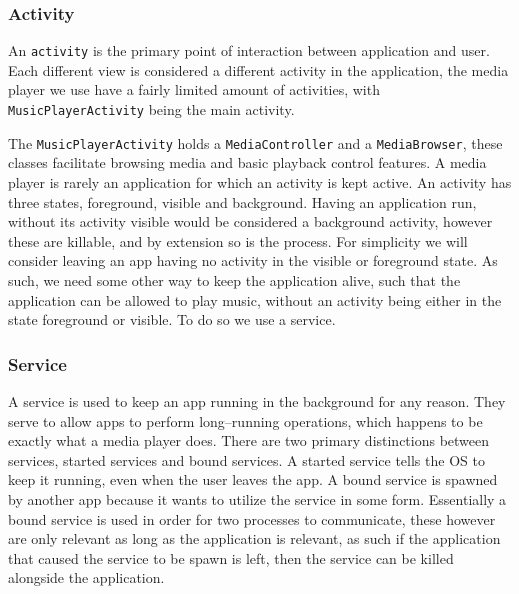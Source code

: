 \subsubsection{Activity}
An \texttt{activity} is the primary point of interaction between application and user.
Each different view is considered a different activity in the application, the media player we use have a fairly limited amount of activities, with \texttt{MusicPlayerActivity} being the main activity.

The \texttt{MusicPlayerActivity} holds a \texttt{MediaController} and a \texttt{MediaBrowser}, these classes facilitate browsing media and basic playback control features.
A media player is rarely an application for which an activity is kept active.
An activity has three states, foreground, visible and background.
Having an application run, without its activity visible would be considered a background activity, however these are killable, and by extension so is the process.
For simplicity we will consider leaving an app having no activity in the visible or foreground state.
As such, we need some other way to keep the application alive, such that the application can be allowed to play music, without an activity being either in the state foreground or visible.
To do so we use a service.



\subsubsection{Service}
A service is used to keep an app running in the background for any reason.
They serve to allow apps to perform long--running operations, which happens to be exactly what a media player does.
There are two primary distinctions between services, started services and bound services.
A started service tells the OS to keep it running, even when the user leaves the app.
A bound service is spawned by another app because it wants to utilize the service in some form.
Essentially a bound service is used in order for two processes to communicate, these however are only relevant as long as the application is relevant, as such if the application that caused the service to be spawn is left, then the service can be killed alongside the application.\cite{androidFundamentals}

